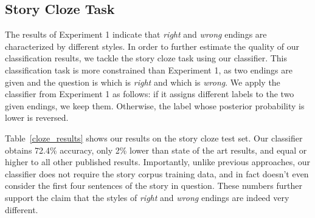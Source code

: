 \documentclass[11pt,a4paper]{article}
\newcommand{\tabref}[1]{Table~\ref{#1}}
\newcommand{\com}[1]{}
\newcommand{\resolved}[1]{}
\newcommand{\roy}[1]{{\color{orange}\textsc{[#1 --rs]}}}
\newcommand{\nascomment}[1]{{\color{blue}\textsc{[#1 --nas]}}}
\renewcommand{\roy}[1]{{\color{orange}[#1 --rs]}}
\renewcommand{\roy}[1]{#1}
\renewcommand{\nascomment}[1]{}
\begin{document}
\subsection{Story Cloze Task}
The results of Experiment 1 indicate that {\it right} and {\it wrong} endings are characterized by different styles.
In order to further estimate the quality of our classification results, we tackle the story cloze task using our classifier.
This classification task is more constrained than Experiment 1, as two
endings are given and the question is which is \emph{right} and which is
\emph{wrong}.
We apply the classifier from Experiment 1 as follows:
if it assigns different labels to the two given endings, we keep
them.  Otherwise, the label whose posterior probability is lower is reversed.

\tabref{cloze_results} shows our results on the story cloze test
set. Our classifier obtains 72.4\% accuracy, \roy{only 2\% lower than state of the art results, and equal or higher to all other published results}\com{12.5\% (absolute) higher than the
published state-of-the-art result on the task \cite{Salle:2016}}\resolved{\nascomment{cite that here}}.
Importantly, unlike previous approaches, our classifier does not require the story corpus training data, and in fact doesn't even consider the first four sentences of the story in question.
These numbers further support the claim that the styles of {\it right} and {\it wrong} endings are indeed very different.
\end{document}
